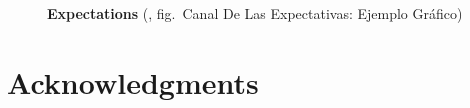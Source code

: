 \documentclass[
  ignorenonframetext,
]{beamer}
\begin{document}
\begin{frame}{}
\label{section-20}
\begin{figure}


\caption{\label{fig-canal-expectativas}\textbf{Expectations}
(, fig.~Canal De Las
Expectativas: Ejemplo Gráfico)}

\end{figure}%
\end{frame}

\section{Acknowledgments}\label{acknowledgments}
\end{document}
